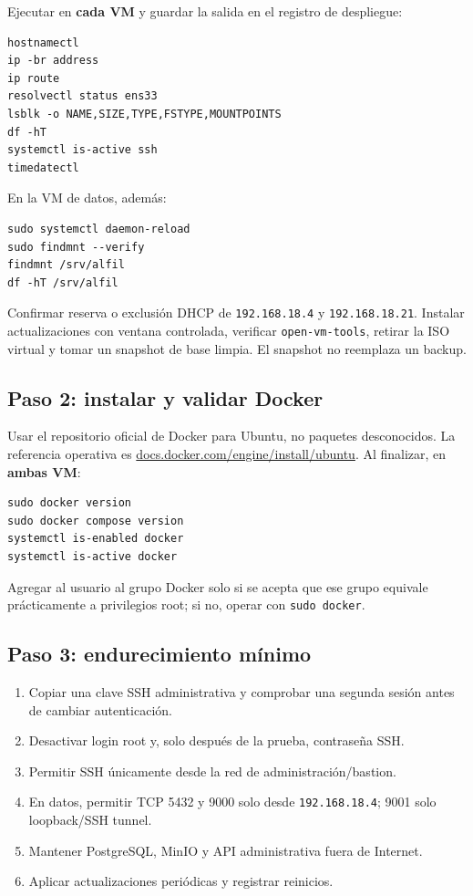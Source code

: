 \documentclass[11pt,a4paper]{article}
\newcommand{\code}[1]{\nolinkurl{#1}}
\begin{document}
Ejecutar en \textbf{cada VM} y guardar la salida en el registro de despliegue:

\begin{lstlisting}
hostnamectl
ip -br address
ip route
resolvectl status ens33
lsblk -o NAME,SIZE,TYPE,FSTYPE,MOUNTPOINTS
df -hT
systemctl is-active ssh
timedatectl
\end{lstlisting}

En la VM de datos, además:
\begin{lstlisting}
sudo systemctl daemon-reload
sudo findmnt --verify
findmnt /srv/alfil
df -hT /srv/alfil
\end{lstlisting}

Confirmar reserva o exclusión DHCP de \code{192.168.18.4} y \code{192.168.18.21}. Instalar actualizaciones con ventana controlada, verificar \code{open-vm-tools}, retirar la ISO virtual y tomar un snapshot de base limpia. El snapshot no reemplaza un backup.

\subsection{Paso 2: instalar y validar Docker}

Usar el repositorio oficial de Docker para Ubuntu, no paquetes desconocidos. La referencia operativa es \href{https://docs.docker.com/engine/install/ubuntu/}{docs.docker.com/engine/install/ubuntu}. Al finalizar, en \textbf{ambas VM}:

\begin{lstlisting}
sudo docker version
sudo docker compose version
systemctl is-enabled docker
systemctl is-active docker
\end{lstlisting}

Agregar al usuario al grupo Docker solo si se acepta que ese grupo equivale prácticamente a privilegios root; si no, operar con \code{sudo docker}.

\subsection{Paso 3: endurecimiento mínimo}

\begin{enumerate}
  \item Copiar una clave SSH administrativa y comprobar una segunda sesión antes de cambiar autenticación.
  \item Desactivar login root y, solo después de la prueba, contraseña SSH.
  \item Permitir SSH únicamente desde la red de administración/bastion.
  \item En datos, permitir TCP 5432 y 9000 solo desde \code{192.168.18.4}; 9001 solo loopback/SSH tunnel.
  \item Mantener PostgreSQL, MinIO y API administrativa fuera de Internet.
  \item Aplicar actualizaciones periódicas y registrar reinicios.
\end{enumerate}
\end{document}

